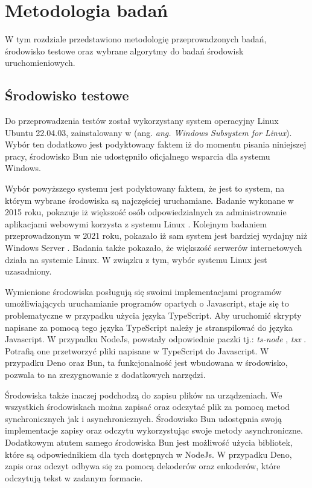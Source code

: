 \section*{Metodologia badań}
W tym rozdziale przedstawiono metodologię przeprowadzonych badań, środowisko testowe oraz wybrane algorytmy do badań środowisk uruchomieniowych.

\subsection*{Środowisko testowe}
Do przeprowadzenia testów został wykorzystany system operacyjny Linux Ubuntu 22.04.03, zainstalowany w (ang. \textit{ang. Windows Subsystem for Linux}). Wybór ten dodatkowo jest podyktowany faktem iż do momentu pisania niniejszej pracy, środowisko Bun nie udostępniło oficjalnego wsparcia dla systemu Windows.

Wybór powyższego systemu jest podyktowany faktem, że jest to system, na którym wybrane środowiska są najczęściej uruchamiane. Badanie wykonane w 2015 roku, pokazuje iż większość osób odpowiedzialnych za administrowanie aplikacjami webowymi korzysta z systemu Linux \cite{performance_comparison_linux}. Kolejnym badaniem przeprowadzonym w 2021 roku, pokazało iż sam system jest bardziej wydajny niż Windows Server \cite{web_server_performance}. Badania także pokazało, że większość serwerów internetowych działa na systemie Linux. W związku z tym, wybór systemu Linux jest uzasadniony.

Wymienione środowiska posługują się swoimi implementacjami programów umożliwiających uruchamianie programów opartych o Javascript, staje się to problematyczne w przypadku użycia języka TypeScript. Aby uruchomić skrypty napisane za pomocą tego języka TypeScript należy je stranspilować do języka Javascript. W przypadku NodeJs, powstały odpowiednie paczki tj.: \textit{ts-node} \cite{ts_node}, \textit{tsx} \cite{tsx}. Potrafią one przetworzyć pliki napisane w TypeScript do Javascript. W przypadku Deno oraz Bun, ta funkcjonalność jest wbudowana w środowisko, pozwala to na zrezygnowanie z dodatkowych narzędzi.

Środowiska także inaczej podchodzą do zapisu plików na urządzeniach. We wszystkich środowiskach można zapisać oraz odczytać plik za pomocą metod synchronicznych jak i asynchronicznych. Środowisko Bun udostępnia swoją implementacje zapisy oraz odczytu wykorzystując swoje metody asynchroniczne. Dodatkowym atutem samego środowiska Bun jest możliwość użycia bibliotek, które są odpowiednikiem dla tych dostępnych w NodeJs. W przypadku Deno, zapis oraz odczyt odbywa się za pomocą dekoderów oraz enkoderów, które odczytują tekst w zadanym formacie.


